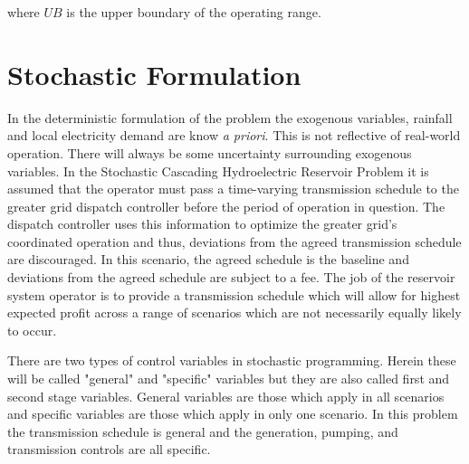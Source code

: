 \documentclass[12pt]{article}
\begin{document}
where $UB$ is the upper boundary of the operating range.


\section*{Stochastic Formulation}

In the deterministic formulation of the problem the exogenous variables, rainfall and local electricity demand are know \textit{a priori}. This is not reflective of real-world operation. There will always be some uncertainty surrounding exogenous variables. In the Stochastic Cascading Hydroelectric Reservoir Problem it is assumed that the operator must pass a time-varying transmission schedule to the greater grid dispatch controller before the period of operation in question. The dispatch controller uses this information to optimize the greater grid's coordinated operation and thus, deviations from the agreed transmission schedule are discouraged. In this scenario, the agreed schedule is the baseline and deviations from the agreed schedule are subject to a fee. The job of the reservoir system operator is to provide a transmission schedule which will allow for highest expected profit across a range of scenarios which are not necessarily equally likely to occur.

There are two types of control variables in stochastic programming. Herein these will be called "general" and "specific" variables but they are also called first and second stage variables. General variables are those which apply in all scenarios and specific variables are those which apply in only one scenario. In this problem the transmission schedule is general and the generation, pumping, and transmission controls are all specific.
\end{document}
